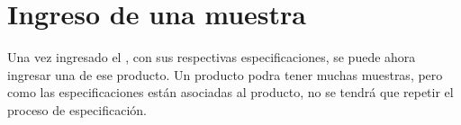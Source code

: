 \documentclass[letterpaper,10pt,spanish]{sphinxmanual}
\begin{document}
\begin{sphinxVerbatim}[commandchars=\\\{\}]
                                                                                                                  
                                                                                                                       
\end{sphinxVerbatim}


\section{Ingreso de una muestra}
\label{\detokenize{requerimientos/laboratorio_aceptacion:ingreso-de-una-muestra}}
Una vez ingresado el , con sus respectivas especificaciones,
se puede ahora ingresar una  de ese producto. Un producto podra
tener muchas muestras, pero como las especificaciones están asociadas al
producto, no se tendrá que repetir el proceso de especificación.
\end{document}
